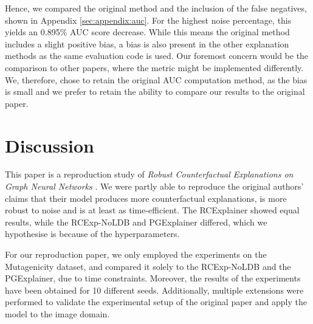 Hence, we compared the original method and the inclusion of the false negatives, shown in Appendix \ref{sec:appendix:auc}. For the highest noise percentage, this yields an 0.895\% AUC score decrease. While this means the original method includes a slight positive bias, a bias is also present in the other explanation methods as the same evaluation code is used. Our foremost concern would be the comparison to other papers, where the metric might be implemented differently. We, therefore,  chose to retain the original AUC computation method, as the bias is small and we prefer to retain the ability to compare our results to the original paper.


\section{Discussion} \label{sec:discussion}
This paper is a reproduction study of \textit{Robust Counterfactual Explanations on Graph Neural Networks} \cite{bajaj2021robust}. We were partly able to reproduce the original authors’ claims that their model produces more counterfactual explanations, is more robust to noise and is at least as time-efficient. The RCExplainer showed equal results, while the RCExp-NoLDB and PGExplainer differed, which we hypothesise is because of the hyperparameters.

For our reproduction paper, we only employed the experiments on the Mutagenicity dataset, and compared it solely to the RCExp-NoLDB and the PGExplainer, due to time constraints. Moreover, the results of the experiments have been obtained for 10 different seeds. Additionally, multiple extensions were performed to validate the experimental setup of the original paper and apply the model to the image domain.


